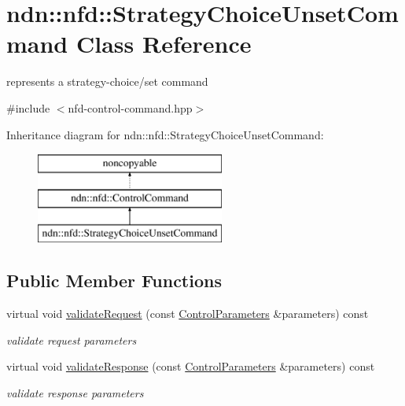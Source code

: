 \hypertarget{classndn_1_1nfd_1_1StrategyChoiceUnsetCommand}{}\section{ndn\+:\+:nfd\+:\+:Strategy\+Choice\+Unset\+Command Class Reference}
\label{classndn_1_1nfd_1_1StrategyChoiceUnsetCommand}


represents a strategy-\/choice/set command  




{\ttfamily \#include $<$nfd-\/control-\/command.\+hpp$>$}

Inheritance diagram for ndn\+:\+:nfd\+:\+:Strategy\+Choice\+Unset\+Command\+:\begin{figure}[H]
\begin{center}
\leavevmode
\includegraphics[height=3.000000cm]{classndn_1_1nfd_1_1StrategyChoiceUnsetCommand}
\end{center}
\end{figure}
\subsection*{Public Member Functions}
\begin{DoxyCompactItemize}
\item 
virtual void \hyperlink{classndn_1_1nfd_1_1StrategyChoiceUnsetCommand_a5360f25cb41ea386e0de3f59cb139205}{validate\+Request} (const \hyperlink{classndn_1_1nfd_1_1ControlParameters}{Control\+Parameters} \&parameters) const
\begin{DoxyCompactList}\small\item\em validate request parameters \end{DoxyCompactList}\item 
virtual void \hyperlink{classndn_1_1nfd_1_1StrategyChoiceUnsetCommand_aa8258b5552a202d02b3e997506d4de25}{validate\+Response} (const \hyperlink{classndn_1_1nfd_1_1ControlParameters}{Control\+Parameters} \&parameters) const
\begin{DoxyCompactList}\small\item\em validate response parameters \end{DoxyCompactList}\end{DoxyCompactItemize}
